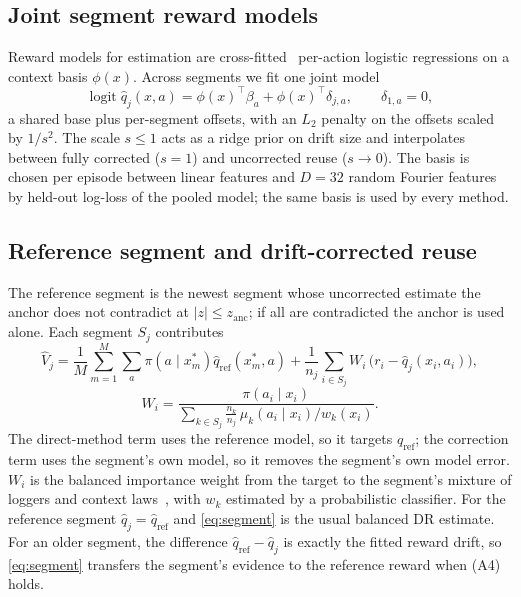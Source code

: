 \subsection{Joint segment reward models}
Reward models for estimation are cross-fitted~\cite{chernozhukov2018double} per-action
logistic regressions on a context basis $\phi(x)$. Across segments we fit one joint model
\begin{equation}
  \operatorname{logit} \hat q_j(x,a)=\phi(x)^\top\beta_a+\phi(x)^\top\delta_{j,a},\qquad \delta_{1,a}=0,
\end{equation}
a shared base plus per-segment offsets, with an $L_2$ penalty on the offsets scaled by
$1/s^2$. The scale $s\le1$ acts as a ridge prior on drift size and interpolates between
fully corrected ($s=1$) and uncorrected reuse ($s\to0$). The basis is chosen per episode
between linear features and $D=32$ random Fourier features~\cite{rahimi2007random} by
held-out log-loss of the pooled model; the same basis is used by every method.

\subsection{Reference segment and drift-corrected reuse}
The reference segment is the newest segment whose uncorrected estimate the anchor does
not contradict at $|z|\le z_{\mathrm{anc}}$; if all are contradicted the anchor is used
alone. Each segment $S_j$ contributes
\begin{equation}\label{eq:segment}
  \hat V_j=\frac1M\sum_{m=1}^M\sum_a\pi(a\mid x^*_m)\hat q_{\mathrm{ref}}(x^*_m,a)
  +\frac1{n_j}\sum_{i\in S_j}W_i\,\big(r_i-\hat q_j(x_i,a_i)\big),
\end{equation}
\begin{equation}
  W_i=\frac{\pi(a_i\mid x_i)}{\sum_{k\in S_j}\frac{n_k}{n_j}\,\mu_k(a_i\mid x_i)/w_k(x_i)}.
\end{equation}
The direct-method term uses the reference model, so it targets $q_{\mathrm{ref}}$; the
correction term uses the segment's own model, so it removes the segment's own model error.
$W_i$ is the balanced importance weight from the target to the segment's mixture of
loggers and context laws~\cite{agarwal2017effective,kallus2021optimal}, with $w_k$
estimated by a probabilistic classifier. For the reference segment $\hat q_j=\hat q_{\mathrm{ref}}$
and \eqref{eq:segment} is the usual balanced DR estimate. For an older segment, the
difference $\hat q_{\mathrm{ref}}-\hat q_j$ is exactly the fitted reward drift, so
\eqref{eq:segment} transfers the segment's evidence to the reference reward when (A4) holds.

